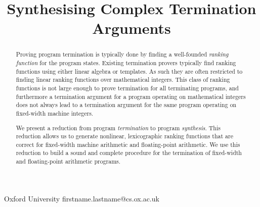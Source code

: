 \documentclass[preprint]{sigplanconf}
\theoremstyle{definition}
\begin{document}
\setlength{\pdfpageheight}{\paperheight}
\setlength{\pdfpagewidth}{\paperwidth}





\title{Synthesising Complex Termination Arguments}

           {Oxford University}
           {firstname.lastname@cs.ox.ac.uk}

\maketitle

\begin{abstract}
Proving program termination is typically done by finding a well-founded \emph{ranking function}
for the program states.
Existing termination provers typically find ranking functions
using either linear algebra or templates.  As such they are often restricted to
finding linear ranking functions over mathematical integers.  This class
of ranking functions is not large enough to prove termination for all terminating
programs, and furthermore a termination argument for a program operating on mathematical integers
does not always lead to a termination argument for the same program operating on
fixed-width machine integers.

We present a reduction from program \emph{termination} to program \emph{synthesis}.
This reduction allows us to generate nonlinear, lexicographic ranking functions that
are correct for fixed-width machine arithmetic and floating-point arithmetic.
We use this reduction to build a sound and complete procedure for the termination
of fixed-width and floating-point arithmetic programs.
\end{abstract}

\end{document}
